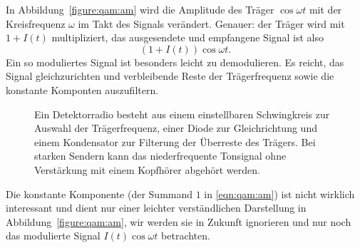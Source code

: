 In Abbildung~\ref{figure:qam:am} wird die Amplitude des Träger
$\cos\omega t$ mit der Kreisfrequenz $\omega$ im Takt des
Signals verändert.
Genauer: der Träger wird mit $1+I(t)$ multipliziert,
das ausgesendete und empfangene Signal ist also
\begin{equation}
(1+I(t)) \cos\omega t.
\label{eqn:qam:am}
\end{equation}
Ein so moduliertes Signal ist besonders leicht zu demodulieren.
Es reicht, das Signal gleichzurichten und verbleibende Reste
der Trägerfrequenz sowie die konstante Komponten auszufiltern.
\begin{figure}
\centering
{}
\caption{Ein Detektorradio besteht aus einem einstellbaren
Schwingkreis zur Auswahl der Trägerfrequenz, einer Diode zur
Gleichrichtung und einem Kondensator zur Filterung der Überreste
des Trägers.
Bei starken Sendern kann das niederfrequente Tonsignal ohne
Verstärkung mit einem Kopfhörer abgehört werden.
\label{figure:qam:detektor}}
\end{figure}
Die konstante Komponente (der Summand $1$ in \eqref{eqn:qam:am})
ist nicht wirklich interessant und dient nur einer leichter
verständlichen Darstellung in Abbildung~\ref{figure:qam:am},
wir werden sie in Zukunft ignorieren und nur noch das modulierte Signal
$I(t)\cos\omega t$ betrachten.

